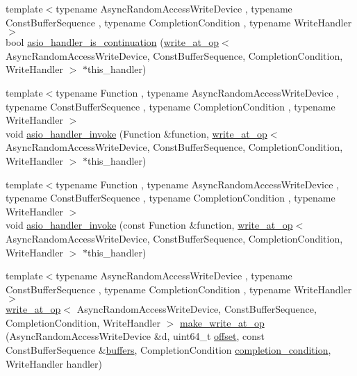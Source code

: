 \begin{DoxyCompactItemize}
\item 
{\footnotesize template$<$typename Async\+Random\+Access\+Write\+Device , typename Const\+Buffer\+Sequence , typename Completion\+Condition , typename Write\+Handler $>$ }\\bool \hyperlink{namespaceasio_1_1detail_a698d3201d106b0c7cbadd686f3947e6d}{asio\+\_\+handler\+\_\+is\+\_\+continuation} (\hyperlink{classasio_1_1detail_1_1write__at__op}{write\+\_\+at\+\_\+op}$<$ Async\+Random\+Access\+Write\+Device, Const\+Buffer\+Sequence, Completion\+Condition, Write\+Handler $>$ $\ast$this\+\_\+handler)
\item 
{\footnotesize template$<$typename Function , typename Async\+Random\+Access\+Write\+Device , typename Const\+Buffer\+Sequence , typename Completion\+Condition , typename Write\+Handler $>$ }\\void \hyperlink{namespaceasio_1_1detail_a7ef3a54f296787f468eae523de570086}{asio\+\_\+handler\+\_\+invoke} (Function \&function, \hyperlink{classasio_1_1detail_1_1write__at__op}{write\+\_\+at\+\_\+op}$<$ Async\+Random\+Access\+Write\+Device, Const\+Buffer\+Sequence, Completion\+Condition, Write\+Handler $>$ $\ast$this\+\_\+handler)
\item 
{\footnotesize template$<$typename Function , typename Async\+Random\+Access\+Write\+Device , typename Const\+Buffer\+Sequence , typename Completion\+Condition , typename Write\+Handler $>$ }\\void \hyperlink{namespaceasio_1_1detail_a909d6a323fc08e7f5e0c040f2bd536e4}{asio\+\_\+handler\+\_\+invoke} (const Function \&function, \hyperlink{classasio_1_1detail_1_1write__at__op}{write\+\_\+at\+\_\+op}$<$ Async\+Random\+Access\+Write\+Device, Const\+Buffer\+Sequence, Completion\+Condition, Write\+Handler $>$ $\ast$this\+\_\+handler)
\item 
{\footnotesize template$<$typename Async\+Random\+Access\+Write\+Device , typename Const\+Buffer\+Sequence , typename Completion\+Condition , typename Write\+Handler $>$ }\\\hyperlink{classasio_1_1detail_1_1write__at__op}{write\+\_\+at\+\_\+op}$<$ Async\+Random\+Access\+Write\+Device, Const\+Buffer\+Sequence, Completion\+Condition, Write\+Handler $>$ \hyperlink{namespaceasio_1_1detail_a9d5ae48a50ca4890f63f61245acadadc}{make\+\_\+write\+\_\+at\+\_\+op} (Async\+Random\+Access\+Write\+Device \&d, uint64\+\_\+t \hyperlink{group__async__read__at_ga8dcdb41a4adfd6fe5322b5dd666d9f29}{offset}, const Const\+Buffer\+Sequence \&\hyperlink{group__async__read_ga54dede45c3175148a77fe6635222c47d}{buffers}, Completion\+Condition \hyperlink{group__async__read_gae2e215d5013596cc2b385bb6c13fa518}{completion\+\_\+condition}, Write\+Handler handler)

\end{DoxyCompactItemize}
